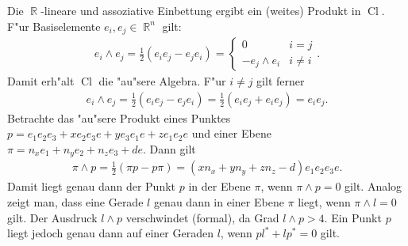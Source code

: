 \documentclass[paper=A4, twoside, chapterprefix=true, bibliography=totoc, headsepline]{scrbook}
\DeclareMathOperator{\R}{\mathbb{R}}
\DeclareMathOperator{\Cl}{Cl}
\theoremstyle{nonumberbreak}
\theoremstyle{emptybreak}
\theoremstyle{break}
\begin{document}
Die $\R$-lineare und assoziative Einbettung ergibt ein (weites) Produkt in $\Cl$.
F"ur Basiselemente $e_i, e_j \in \R^n$ gilt:
\begin{align*}
	e_i \wedge e_j = \frac{1}{2} (e_i e_j - e_j e_i) = \begin{cases}
		0 & i = j \\ -e_j \wedge e_i & i \ne i
	\end{cases}.
\end{align*}
Damit erh"alt $\Cl$ die "au"sere Algebra.
F"ur $i \ne j$ gilt ferner
\begin{align*}
	e _i \wedge e_j = \frac{1}{2} (e_i e_j - e_j e_i) = \frac{1}{2} (e_i e_j + e_i e_j) = e_i e_j.
\end{align*}
Betrachte das "au"sere Produkt eines Punktes $p = e_1 e_2 e_3 + x e_2 e_3 e + y e_3 e_1 e + z e_1 e_2 e$ und einer Ebene $\pi = n_x e_1 + n_y e_2 + n_z e_3 + d e$.
Dann gilt
\begin{align*}
	\pi \wedge p = \frac{1}{2} (\pi p - p \pi) = (x n_x + y n_y + z n_z - d) e_1 e_2 e_3 e.
\end{align*}
Damit liegt  genau dann der Punkt $p$ in der Ebene $\pi$, wenn $\pi \wedge p = 0$ gilt.
Analog zeigt man, dass eine Gerade $l$ genau dann in einer Ebene $\pi$ liegt, wenn $\pi \wedge l = 0$ gilt.
Der Ausdruck $l \wedge p$ verschwindet (formal), da Grad $l \wedge p  > 4$.
Ein Punkt $p$ liegt jedoch genau dann auf einer Geraden $l$, wenn $p l^* + l p^* = 0$ gilt.
\end{document}
